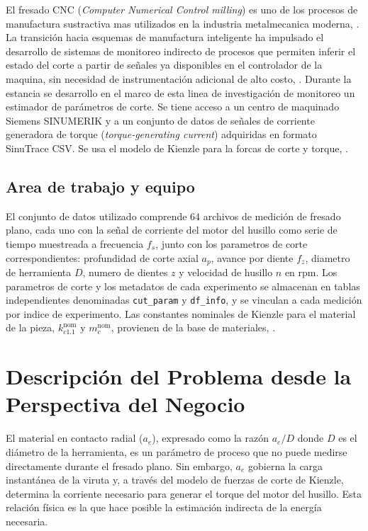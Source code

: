 \documentclass[12pt, letterpaper]{article}
\begin{document}
El fresado CNC (\textit{Computer Numerical Control milling}) es uno de los procesos de manufactura sustractiva mas utilizados en la industria metalmecanica moderna, \cite{altintas2012}. La transición hacia esquemas de manufactura inteligente ha impulsado el desarrollo de sistemas de monitoreo indirecto de procesos que permiten inferir el estado del corte a partir de señales ya disponibles en el controlador de la maquina, sin necesidad de instrumentación adicional de alto costo, \cite{byrne1995, postel2019}. Durante la estancia se desarrollo en el marco de esta linea de investigación de monitoreo un estimador de parámetros de corte. Se tiene acceso a un centro de maquinado Siemens SINUMERIK y a un conjunto de datos de señales de corriente generadora de torque (\textit{torque-generating current}) adquiridas en formato SinuTrace CSV. Se usa el modelo de Kienzle para la forcas de corte y torque, \cite{kienzle1957}.

\subsection{Area de trabajo y equipo}

El conjunto de datos utilizado comprende 64 archivos de medición de fresado plano, cada uno con la señal de corriente del motor del husillo como serie de tiempo muestreada a frecuencia $f_s$, junto con los parametros de corte correspondientes: profundidad de corte axial $a_p$, avance por diente $f_z$, diametro de herramienta $D$, numero de dientes $z$ y velocidad de husillo $n$ en rpm. Los parametros de corte y los metadatos de cada experimento se almacenan en tablas independientes denominadas \texttt{cut\_param} y \texttt{df\_info}, y se vinculan a cada medición por indice de experimento. Las constantes nominales de Kienzle para el material de la pieza, $k_{c1.1}^{\text{nom}}$ y $m_c^{\text{nom}}$, provienen de la base de materiales, \cite{MachiningDoctorKc}.

\section{Descripción del Problema desde la Perspectiva del Negocio}

El material en contacto radial ($a_e$), expresado como la razón $a_e/D$ donde $D$ es el diámetro de la herramienta, es un parámetro de proceso que no puede medirse directamente durante el fresado plano. Sin embargo, $a_e$ gobierna la carga instantánea de la viruta y, a través del modelo de fuerzas de corte de Kienzle, determina la corriente necesario para generar el torque del motor del husillo. Esta relación física es la que hace posible la estimación indirecta de la energía necesaria.
\end{document}
